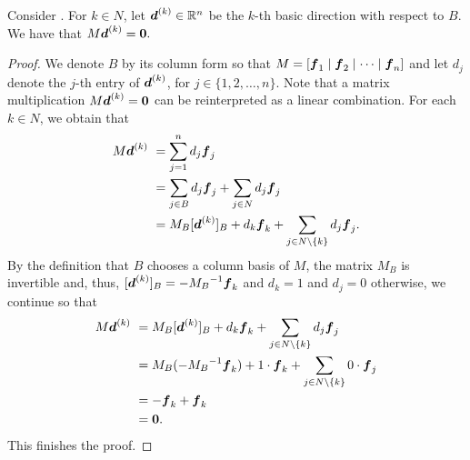 \begin{lemma}\label{lemma: basic direction}
Consider \LPSA. For $k \in N$, let ${\boldsymbol d}^{(k)} \in \mathbb R^n$ be the $k$-th basic direction with respect to $ B $. We have that $ M {\boldsymbol d}^{(k)} = \boldsymbol 0.$ 
\end{lemma}
\begin{proof}
We denote $B$ by its column form so that $M = [{\boldsymbol f}_1 \mid {\boldsymbol f}_2 \mid \dots \mid {\boldsymbol f}_n]$ and let $d_j$ denote the $j$-th entry of ${\boldsymbol d}^{(k)}$, for $j\in\{1,2,\dots, n\}$. Note that a matrix multiplication $M {\boldsymbol d}^{(k)} = \boldsymbol 0$ can be reinterpreted as a linear combination. For each $k\in N$, we obtain that 
\begin{equation*}\begin{split}
M {\boldsymbol d}^{(k)} ~ & =  \sum_{j = 1}^n d_j {\boldsymbol f}_j \\ 
& = \sum_{j \in B} d_j {\boldsymbol f}_j +  \sum_{j \in N} d_j {\boldsymbol f}_j \\
& = M_B [{\boldsymbol d}^{(k)}]_B +  d_k{\boldsymbol f}_k +  \sum_{j \in N\setminus \{k\}} d_j {\boldsymbol f}_j. 
\end{split}\end{equation*}
By the definition that $B$ chooses a column basis of $M$, the matrix $M_B$ is invertible and, thus, $[{\boldsymbol d}^{(k)}]_B = - {M_B}^{-1} {\boldsymbol f}_k$ and $d_k = 1$ and $d_j = 0$ otherwise, we continue so that  
\begin{equation*}\begin{split}
M {\boldsymbol d}^{(k)} ~ & = M_B [{\boldsymbol d}^{(k)}]_B +  d_k{\boldsymbol f}_k +  \sum_{j \in N\setminus \{k\}} d_j {\boldsymbol f}_j \\
& = M_B (- {M_B}^{-1} {\boldsymbol f}_k) +  1\cdot {\boldsymbol f}_k +  \sum_{j \in N\setminus \{k\}} 0 \cdot {\boldsymbol f}_j \\
& = - {\boldsymbol f}_k + {\boldsymbol f}_k \\ 
& = \boldsymbol 0. 
\end{split}\end{equation*}
This finishes the proof.
\end{proof}



